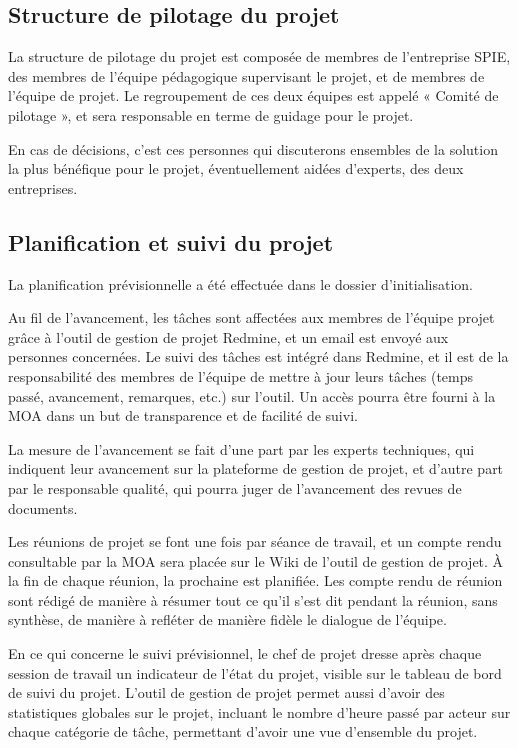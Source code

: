 \documentclass[a4paper, 18pt]{article}
\begin{document}
\subsection{Structure de pilotage du projet}

La structure de pilotage du projet est composée de membres de l'entreprise SPIE, des membres de l'équipe pédagogique supervisant le projet, et de membres de l'équipe de projet. Le regroupement de ces deux équipes est appelé « Comité de pilotage », et sera responsable en terme de guidage pour le projet.

En cas de décisions, c'est ces personnes qui discuterons ensembles de la solution la plus bénéfique pour le projet, éventuellement aidées d'experts, des deux entreprises.

\subsection{Planification et suivi du projet }

La planification prévisionnelle a été effectuée dans le dossier d'initialisation.

Au fil de l'avancement, les tâches sont affectées aux membres de l'équipe projet grâce à l'outil de gestion de projet Redmine, et un email est envoyé aux personnes concernées. Le suivi des tâches est intégré dans Redmine, et il est de la responsabilité des membres de l'équipe de mettre à jour leurs tâches (temps passé, avancement, remarques, etc.) sur l'outil. Un accès pourra être fourni à la MOA dans un but de transparence et de facilité de suivi.

La mesure de l'avancement se fait d'une part par les experts techniques, qui indiquent leur avancement sur la plateforme de gestion de projet, et d'autre part par le responsable qualité, qui pourra juger de l'avancement des revues de documents.

Les réunions de projet se font une fois par séance de travail, et un compte rendu consultable par la MOA sera placée sur le Wiki de l'outil de gestion de projet. À la fin de chaque réunion, la prochaine est planifiée. Les compte rendu de réunion sont rédigé de manière à résumer tout ce qu'il s'est dit pendant la réunion, sans synthèse, de manière à refléter de manière fidèle le dialogue de l'équipe.

En ce qui concerne le suivi prévisionnel, le chef de projet dresse après chaque session de travail un indicateur de l'état du projet, visible sur le tableau de bord de suivi du projet. L'outil de gestion de projet permet aussi d'avoir des statistiques globales sur le projet, incluant le nombre d'heure passé par acteur sur chaque catégorie de tâche, permettant d'avoir une vue d'ensemble du projet.
\end{document}
